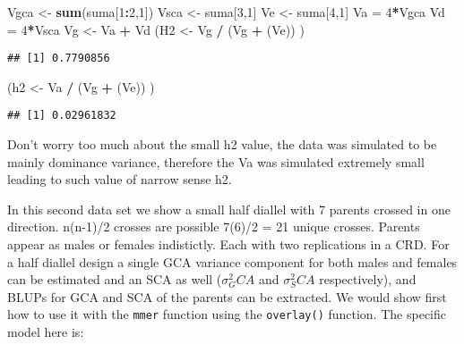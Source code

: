 \documentclass[]{article}
\newenvironment{Shaded}{\begin{snugshade}}{\end{snugshade}}
\newcommand{\KeywordTok}[1]{\textcolor[rgb]{0.13,0.29,0.53}{\textbf{#1}}}
\newcommand{\DecValTok}[1]{\textcolor[rgb]{0.00,0.00,0.81}{#1}}
\newcommand{\StringTok}[1]{\textcolor[rgb]{0.31,0.60,0.02}{#1}}
\newcommand{\OperatorTok}[1]{\textcolor[rgb]{0.81,0.36,0.00}{\textbf{#1}}}
\newcommand{\NormalTok}[1]{#1}
\begin{document}
\begin{Shaded}
\begin{Highlighting}[]
\NormalTok{Vgca <-}\StringTok{ }\KeywordTok{sum}\NormalTok{(suma[}\DecValTok{1}\OperatorTok{:}\DecValTok{2}\NormalTok{,}\DecValTok{1}\NormalTok{])}
\NormalTok{Vsca <-}\StringTok{ }\NormalTok{suma[}\DecValTok{3}\NormalTok{,}\DecValTok{1}\NormalTok{]}
\NormalTok{Ve <-}\StringTok{ }\NormalTok{suma[}\DecValTok{4}\NormalTok{,}\DecValTok{1}\NormalTok{]}
\NormalTok{Va =}\StringTok{ }\DecValTok{4}\OperatorTok{*}\NormalTok{Vgca}
\NormalTok{Vd =}\StringTok{ }\DecValTok{4}\OperatorTok{*}\NormalTok{Vsca}
\NormalTok{Vg <-}\StringTok{ }\NormalTok{Va }\OperatorTok{+}\StringTok{ }\NormalTok{Vd}
\NormalTok{(H2 <-}\StringTok{ }\NormalTok{Vg }\OperatorTok{/}\StringTok{ }\NormalTok{(Vg }\OperatorTok{+}\StringTok{ }\NormalTok{(Ve)) )}
\end{Highlighting}
\end{Shaded}

\begin{verbatim}
## [1] 0.7790856
\end{verbatim}

\begin{Shaded}
\begin{Highlighting}[]
\NormalTok{(h2 <-}\StringTok{ }\NormalTok{Va }\OperatorTok{/}\StringTok{ }\NormalTok{(Vg }\OperatorTok{+}\StringTok{ }\NormalTok{(Ve)) )}
\end{Highlighting}
\end{Shaded}

\begin{verbatim}
## [1] 0.02961832
\end{verbatim}

Don't worry too much about the small h2 value, the data was simulated to
be mainly dominance variance, therefore the Va was simulated extremely
small leading to such value of narrow sense h2.

In this second data set we show a small half diallel with 7 parents
crossed in one direction. n(n-1)/2 crosses are possible 7(6)/2 = 21
unique crosses. Parents appear as males or females indistictly. Each
with two replications in a CRD. For a half diallel design a single GCA
variance component for both males and females can be estimated and an
SCA as well (\(\sigma^2_GCA\) and \(\sigma^2_SCA\) respectively), and
BLUPs for GCA and SCA of the parents can be extracted. We would show
first how to use it with the \texttt{mmer} function using the
\texttt{overlay()} function. The specific model here is:
\end{document}
